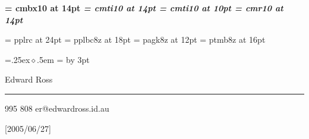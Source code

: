 \def\name{Edward Ross}
\def\addrone{}
\def\addrtwo{}
\def\phone{0403 995 808}
\def\email{er@edwardross.id.au}

\font\bf = cmbx10 at 14pt
\font\it = cmti10 at 14pt
\font\smallit = cmti10 at 10pt
\font\rm = cmr10 at 14pt

\def\nameReference#1{{\it #1}}

\font\titleFont = pplrc at 24pt
\font\headFont = pplbc8z at 18pt
\font\infoFont = pagk8z at 12pt
\font\sectionFont = ptmb8z at 16pt


\parskip=0pt
\parindent=0pt

\def\head#1{\vskip2pt\hfil\headFont #1\hfill\vskip3pt}

\def\startSkill{\relax}
\def\skill#1{\rm {\vskip10pt {\sectionFont #1}}\vskip6pt}
\def\endSkill{\relax}

\def\bullet{\leavevmode\raise .25ex\hbox{$\diamond$}\kern.5em}
\newdimen\bulletSize
{}=\hbox{\bullet}
\bulletSize=
\advance\bulletSize by 3pt 
\def\startExp#1#2#3{\rm{\sectionFont #1} \hfill {\it #2}\par\nobreak\vskip1pt\nobreak #3\par\nobreak\vskip2.5pt\nobreak\leftskip=0mm\parskip=1pt}
\def\exp#1{\hangindent=\bulletSize\hangafter=1%
\bullet #1 \par}
\def\endExp{\leftskip=0mm\parskip=0mm\vskip10pt}

\def\description#1{{\rm #1}}


\def\skilljump{\vskip2mm}


\def\pageHead{\hfil {\titleFont\name} \hfil
\vskip 3pt
\hrule 
\vskip 5pt
{\infoFont\phone} \hfill {\infoFont\markupEmail{\email}}\par
\vskip 2pt}


\ifx\pdfoutput\undefined
\def\markupEmail#1{#1}
\pageHead
\else
 
\beginpackages
  \usepackage{url}[2005/06/27]
  \usepackage{color}
\endpackages
\enablehyperlinks
{}


